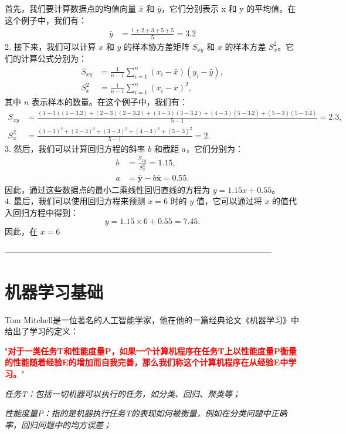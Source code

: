 \documentclass{article}
\begin{document}
    首先，我们要计算数据点的均值向量 $\bar{x}$ 和 $\bar{y}$，它们分别表示 x 和 y 的平均值。在这个例子中，我们有：
$$
\begin{aligned}
    \bar{y} &= \frac{1+2+3+5+5}{5} = 3.2
\end{aligned}
$$
2. 接下来，我们可以计算 $x$ 和 $y$ 的样本协方差矩阵 $S_{xy}$ 和 $x$ 的样本方差 $S_x^2$。它们的计算公式分别为： 
$$\begin{aligned} 
    S_{xy} &= \frac{1}{n-1}\sum_{i=1}^n(x_i - \bar{x})(y_i - \bar{y}),\\ 
    S_x^2 &= \frac{1}{n-1}\sum_{i=1}^n(x_i - \bar{x})^2, 
\end{aligned}
$$ 
其中 $n$ 表示样本的数量。在这个例子中，我们有： 
$$
\begin{aligned} 
    S_{xy} &= \frac{(1-3)(1-3.2)+(2-3)(2-3.2)+(3-3)(3-3.2)+(4-3)(5-3.2)+(5-3)(5-3.2)}{5-1} = 2.3,\\ 
    S_x^2 &= \frac{(1-3)^2+(2-3)^2+(3-3)^2+(4-3)^2+(5-3)^2}{5-1} = 2.
\end{aligned}
$$ 
3. 然后，我们可以计算回归方程的斜率 $b$ 和截距 $a$，它们分别为： 
$$
\begin{aligned}
    b &= \frac{S_{xy}}{S_x^2} = 1.15,\\ 
    a &= \mathbf{\bar{y}} - b\mathbf{\bar{x}} = 0.55.
\end{aligned}
$$ 
因此，通过这些数据点的最小二乘线性回归直线的方程为 $y = 1.15x + 0.55$。 \\
4. 最后，我们可以使用回归方程来预测 $x=6$ 时的 $y$ 值，它可以通过将 $x$ 的值代入回归方程中得到： 
$$y = 1.15\times 6 + 0.55 = 7.45.$$ 
因此，在 $x=6$

--------------------------------------------------------------------------------------------------
\section{机器学习基础}
\setlength{\parindent}{20pt}
\setlength{\parindent}{0pt}
\setlength{\parindent}{20pt}
\indent

Tom Mitchell是一位著名的人工智能学家，他在他的一篇经典论文《机器学习》中给出了学习的定义：

"\textcolor{red}{\textbf{对于一类任务T和性能度量P，如果一个计算机程序在任务T上以性能度量P衡量的性能随着经验E的增加而自我完善，那么我们称这个计算机程序在从经验E中学习。}}"

\textit{任务T：包括一切机器可以执行的任务，如分类、回归、聚类等；}

\textit{性能度量P：指的是机器执行任务T的表现如何被衡量，例如在分类问题中正确率，回归问题中的均方误差；}
\end{document}
